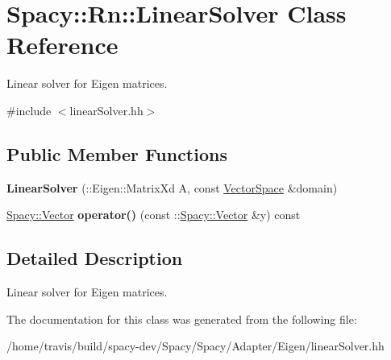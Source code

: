 \hypertarget{classSpacy_1_1Rn_1_1LinearSolver}{\section{Spacy\-:\-:Rn\-:\-:Linear\-Solver Class Reference}
\label{classSpacy_1_1Rn_1_1LinearSolver}
}


Linear solver for Eigen matrices.  




{\ttfamily \#include $<$linear\-Solver.\-hh$>$}

\subsection*{Public Member Functions}
\begin{DoxyCompactItemize}
\item 
\hypertarget{classSpacy_1_1Rn_1_1LinearSolver_ac50d2a63149b336622ecd4114d2cfe5a}{{\bfseries Linear\-Solver} (\-::Eigen\-::\-Matrix\-Xd A, const \hyperlink{classSpacy_1_1VectorSpace}{Vector\-Space} \&domain)}\label{classSpacy_1_1Rn_1_1LinearSolver_ac50d2a63149b336622ecd4114d2cfe5a}

\item 
\hypertarget{classSpacy_1_1Rn_1_1LinearSolver_a11483b4db3dd9f91ffbcea121c0eadd4}{\hyperlink{classSpacy_1_1Vector}{Spacy\-::\-Vector} {\bfseries operator()} (const \-::\hyperlink{classSpacy_1_1Vector}{Spacy\-::\-Vector} \&y) const }\label{classSpacy_1_1Rn_1_1LinearSolver_a11483b4db3dd9f91ffbcea121c0eadd4}

\end{DoxyCompactItemize}


\subsection{Detailed Description}
Linear solver for Eigen matrices. 

The documentation for this class was generated from the following file\-:\begin{DoxyCompactItemize}
\item 
/home/travis/build/spacy-\/dev/\-Spacy/\-Spacy/\-Adapter/\-Eigen/linear\-Solver.\-hh\end{DoxyCompactItemize}
